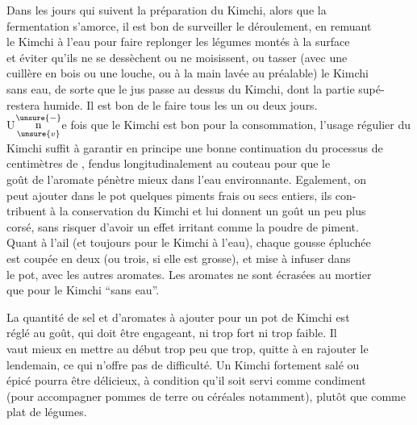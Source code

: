 Dans les jours qui suivent la préparation du Kimchi, alors que la\\
fermentation s'amorce, il est bon de surveiller le déroulement, en remuant\\
le Kimchi à l'eau pour faire replonger les légumes montés à la surface\\
et éviter qu'ils ne se dessèchent ou ne moisissent, ou tasser (avec une\\
cuillère en bois ou une louche, ou à la main lavée au préalable) le Kimchi\\
sans eau, de sorte que le jus passe au dessus du Kimchi, dont la partie supé-\\
 restera humide. Il est bon de le faire tous les un ou deux jours.\\
U$\underset{\unsure{v}}{\overset{\unsure{-}}{\mathrm n}}$e fois que le Kimchi est bon pour la consommation, l'usage régulier du\\
Kimchi suffit à garantir en principe une bonne continuation du processus de
centimètres de , fendus longitudinalement au couteau pour que le\\
goût de l'aromate pénètre mieux dans l'eau environnante. Egalement, on\\
peut ajouter dans le pot quelques piments frais ou secs entiers, ils con-\\
tribuent à la conservation du Kimchi et lui donnent un goût un peu plus\\
corsé, sans risquer d'avoir un effet irritant comme la poudre de piment.\\
Quant à l'ail (et toujours pour le Kimchi à l'eau), chaque gousse épluchée\\
est coupée en deux (ou trois, si elle est grosse), et mise à infuser dans\\
le pot, avec les autres aromates. Les aromates ne sont écrasées au mortier\\
que pour le Kimchi ``sans eau''.

La quantité de sel et d'aromates à ajouter pour un pot de Kimchi est\\
réglé au goût, qui doit être engageant, ni trop fort ni trop faible. Il\\
vaut mieux en mettre au début trop peu que trop, quitte à en rajouter le\\
lendemain, ce qui n'offre pas de difficulté. Un Kimchi fortement salé ou\\
épicé pourra être délicieux, à condition qu'il soit servi comme condiment\\
(pour accompagner pommes de terre ou céréales notamment), plutôt que comme\\
plat de légumes.

